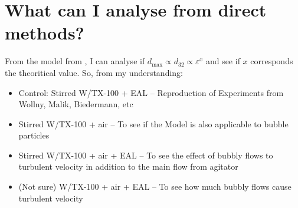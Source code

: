 \section{What can I analyse from direct methods?}
From the model from \citet{shinnar1961behaviour}, I can analyse if $d_\text{max} \propto d_{32} \propto \varepsilon^x$ and see if $x$ corresponds the theoritical value. So, from my understanding:
\begin{itemize}
    \item Control: Stirred W/TX-100 + EAL -- Reproduction of Experiments from Wollny, Malik, Biedermann, etc
    \item Stirred W/TX-100 + air -- To see if the Model is also applicable to bubble particles
    \item Stirred W/TX-100 + air + EAL -- To see the effect of bubbly flows to turbulent velocity in addition to the main flow from agitator
    \item (Not sure) W/TX-100 + air + EAL -- To see how much bubbly flows cause turbulent velocity
\end{itemize}
\vspace{5cm}
